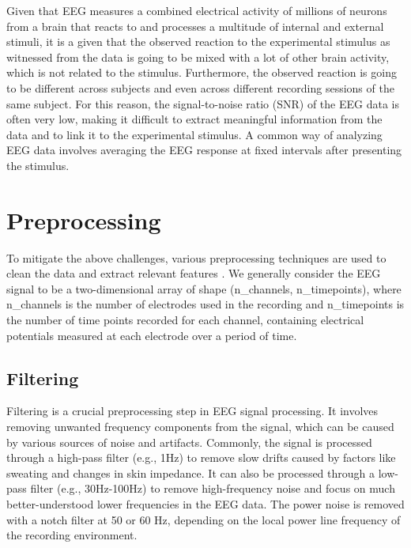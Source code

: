 Given that EEG measures a combined electrical activity of millions of neurons from a brain that reacts to and processes a multitude of internal and external stimuli, 
it is a given that the observed reaction to the experimental stimulus as witnessed from the data is going to be mixed with a lot of other brain activity, which is not related to the stimulus.
Furthermore, the observed reaction is going to be different across subjects and even across different recording sessions of the same subject.
For this reason, the signal-to-noise ratio (SNR) of the EEG data is often very low, making it difficult to extract meaningful information from the data and to link it to the experimental stimulus.
A common way of analyzing EEG data involves averaging the EEG response at fixed intervals after presenting the stimulus.

\section{Preprocessing}

To mitigate the above challenges, various preprocessing techniques are used to clean the data and extract relevant features \cite{cyril}.
We generally consider the EEG signal to be a two-dimensional array of shape (n\_channels, n\_timepoints), where n\_channels is the number of electrodes used in the recording and n\_timepoints is the number of time points recorded for each channel, containing electrical potentials measured at each electrode over a period of time.

\subsection{Filtering}

Filtering is a crucial preprocessing step in EEG signal processing. It involves removing unwanted frequency components from the signal, which can be caused by various sources of noise and artifacts.
Commonly, the signal is processed through a high-pass filter (e.g., 1Hz) to remove slow drifts caused by factors like sweating and changes in skin impedance.
It can also be processed through a low-pass filter (e.g., 30Hz-100Hz) to remove high-frequency noise and focus on much better-understood lower frequencies in the EEG data.
The power noise is removed with a notch filter at 50 or 60 Hz, depending on the local power line frequency of the recording environment.

